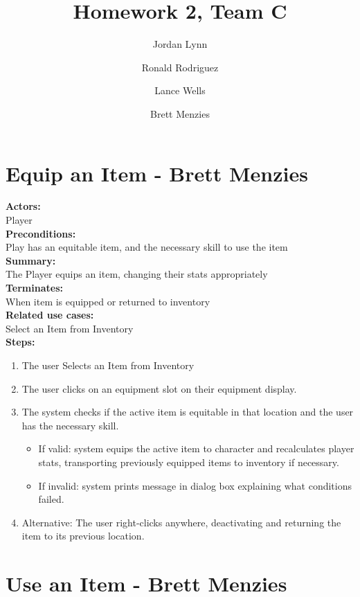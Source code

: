 \documentclass[12pt]{article}
\title{Homework 2, Team C}
\author{ Jordan Lynn 
\and Ronald Rodriguez 
\and Lance Wells 
\and Brett Menzies
\and 
}
\begin{document}
    \maketitle

\pagebreak

\section{Equip an Item - Brett Menzies}

\textbf{Actors:} \hfil \\ \indent Player \\
\textbf{Preconditions:} \hfil \\ \indent Play has an equitable item, and the necessary skill to use the item \\
\textbf{Summary:} \hfil \\ \indent The Player equips an item, changing their stats appropriately \\
\textbf{Terminates:} \hfil \\ \indent When item is equipped or returned to inventory \\
\textbf{Related use cases:} \hfil \\ \indent Select an Item from Inventory \\
\textbf{Steps:}

\begin{enumerate}
	\item The user Selects an Item from Inventory
	\item The user clicks on an equipment slot on their equipment display.
	\item The system checks if the active item is equitable in that location and the user has the necessary skill.
	\begin{itemize}
		\item If valid: system equips the active item to character and recalculates player stats,
			transporting previously equipped items to inventory if necessary.
		\item If invalid: system prints message in dialog box explaining what conditions failed.
	\end{itemize}
	\item Alternative: The user right-clicks anywhere, deactivating and returning the item to its previous location.
\end{enumerate} 

\hfil \linebreak

\section{Use an Item - Brett Menzies}
\end{document}
